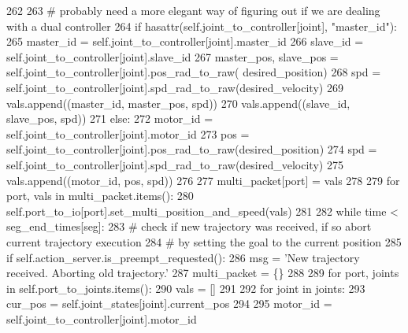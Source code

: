 \begin{DoxyCode}
{{{{{{{262                     
263                     \textcolor{comment}{# probably need a more elegant way of figuring out if we are dealing with a dual
       controller}
264                     \textcolor{keywordflow}{if} hasattr(self.joint\_to\_controller[joint], \textcolor{stringliteral}{"master\_id"}):
265                         master\_id = self.joint\_to\_controller[joint].master\_id
266                         slave\_id = self.joint\_to\_controller[joint].slave\_id
267                         master\_pos, slave\_pos = self.joint\_to\_controller[joint].pos\_rad\_to\_raw(
      desired\_position)
268                         spd = self.joint\_to\_controller[joint].spd\_rad\_to\_raw(desired\_velocity)
269                         vals.append((master\_id, master\_pos, spd))
270                         vals.append((slave\_id, slave\_pos, spd))
271                     \textcolor{keywordflow}{else}:
272                         motor\_id = self.joint\_to\_controller[joint].motor\_id
273                         pos = self.joint\_to\_controller[joint].pos\_rad\_to\_raw(desired\_position)
274                         spd = self.joint\_to\_controller[joint].spd\_rad\_to\_raw(desired\_velocity)
275                         vals.append((motor\_id, pos, spd))
276                     
277                 multi\_packet[port] = vals
278                 
279             \textcolor{keywordflow}{for} port, vals \textcolor{keywordflow}{in} multi\_packet.items():
280                 self.port\_to\_io[port].set\_multi\_position\_and\_speed(vals)
281                 
282             \textcolor{keywordflow}{while} time < seg\_end\_times[seg]:
283                 \textcolor{comment}{# check if new trajectory was received, if so abort current trajectory execution}
284                 \textcolor{comment}{# by setting the goal to the current position}
285                 \textcolor{keywordflow}{if} self.action\_server.is\_preempt\_requested():
286                     msg = \textcolor{stringliteral}{'New trajectory received. Aborting old trajectory.'}
287                     multi\_packet = \{\}
288                     
289                     \textcolor{keywordflow}{for} port, joints \textcolor{keywordflow}{in} self.port\_to\_joints.items():
290                         vals = []
291                         
292                         \textcolor{keywordflow}{for} joint \textcolor{keywordflow}{in} joints:
293                             cur\_pos = self.joint\_states[joint].current\_pos
294                             
295                             motor\_id = self.joint\_to\_controller[joint].motor\_id
}}}}}}}
\end{DoxyCode}

